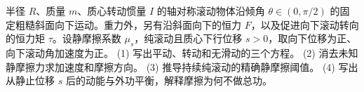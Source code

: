 半径 \(R\)、质量 \(m\)、质心转动惯量 \(I\) 的轴对称滚动物体沿倾角 \(\theta\in(0,\pi/2)\) 的固定粗糙斜面向下运动。重力外，另有沿斜面向下的恒力 \(F\)，以及促进向下滚动转向的恒力矩 \(\tau\)。设静摩擦系数 \(\mu_s\)，纯滚动且质心下行位移 \(s>0\)，取向下位移为正、向下滚动角加速度为正。
(1) 写出平动、转动和无滑动的三个方程。
(2) 消去未知静摩擦力求加速度和摩擦方向。
(3) 推导持续纯滚动的精确静摩擦阈值。
(4) 写出从静止位移 \(s\) 后的动能与外功平衡，解释摩擦为何不做总功。
